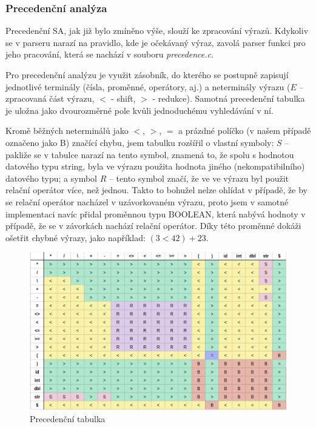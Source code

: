 \documentclass[11pt,a4paper]{article}
\begin{document}
        \subsubsection{Precedenční analýza} \label{Prec_Analyza}
        Precedenční SA, jak již bylo zmíněno výše, slouží ke zpracování výrazů. Kdykoliv se v parseru narazí na pravidlo, kde je očekávaný výraz, zavolá parser funkci pro jeho pracování, která se nachází v souboru \emph{precedence.c}.

        Pro precedenční analýzu je využit zásobník, do kterého se postupně zapisují jednotlivé terminály (čísla, proměnné, operátory, aj.) a neterminály výrazu ($E$ – zpracovaná část výrazu, $<$ - shift, $>$ - redukce). Samotná precedenční tabulka je uložna jako dvourozměrné pole kvůli jednoduchému vyhledávání v ní.

        Kromě běžných neterminálů jako $<$, $>$, $=$ a prázdné políčko (v našem případě označeno jako B) značící chybu, jsem tabulku rozšířil o vlastní symboly: $S$ – pakliže se v tabulce narazí na tento symbol, znamená to, že spolu s hodnotou datového typu string, byla ve výrazu použita hodnota jiného (nekompatibilního) datového typu; a symbol $R$ – tento symbol značí, že ve ve výrazu byl použit relační operátor více, než jednou. Takto to bohužel nelze ohlídat v případě, že by se relační operátor nacházel v uzávorkovaném výrazu, proto jsem v samotné implementaci navíc přidal proměnnou typu BOOLEAN, která nabývá hodnoty  v případě, že se v závorkách nachází relační operátor. Díky této proměnné dokáži ošetřit chybné výrazy, jako například: $(3 < 42) + 23$.

            \vspace{1cm}
            \begin{figure}[h!]
                \centering
                \includegraphics[width=15cm]{precTable.png}
                \caption{Precedenční tabulka}
                \label{obr:PT}
            \end{figure}
\end{document}
